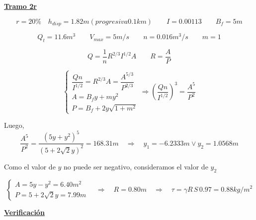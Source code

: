 \underline{\bf Tramo 2r}


\begin{equation*}
  r = 20\%
  \quad
  h_{disp} = 1.82 m (progresiva 0.1 km)
 \qquad
  I = 0.00113
 \qquad
  B_{f} = 5 m
\end{equation*}

\begin{equation*}
  Q_{t} = 11.6 m^{3}
 \qquad
  V_{max} = 5 m/s
 \qquad
  n = 0.016 m^3/s
 \qquad
  m = 1
\end{equation*}

\begin{equation*}
 Q = \frac{1}{n} R^{2/3} I^{1/2} A
 \qquad
 R = \frac{A}{P}
\end{equation*}

\begin{equation*}
  \begin{cases}
    \dfrac{Q n}{I^{1/2}} = R^{2/3} A = \dfrac{A^{5/3}}{P^{2/3}} \\
    A = B_{f}y + m y^{2} \\
    P = B_{f} + 2 y \sqrt{1 + m^{2}}
  \end{cases}
  \Longrightarrow
  (\dfrac{Q n}{I^{1/2}})^{3} = \dfrac{A^{5}}{P^{2}}
\end{equation*}

Luego,
\begin{equation*}
  \dfrac{A^{5}}{P^{2}} = \dfrac{(5 y + y^{2})^{5}}{(5 + 2 \sqrt{2} y)^{2}} = 168.31 m
  \quad
  \Longrightarrow
  \quad
  y_{1} = -6.2333 m \vee y_{2} = 1.0568 m
\end{equation*}


Como el valor de $y$ no puede ser negativo, consideramos el valor de $y_{2}$

\begin{equation*}
  \begin{cases}
    A = 5 y - y^{2} = 6.40 m^{2} \\
    P = 5 + 2 \sqrt{2} y = 7.99 m
  \end{cases}
  \quad
  \Longrightarrow
  \quad
  R = 0.80 m
  \quad
  \Longrightarrow
  \quad
  \tau = \gamma R \, S \, 0.97 = 0.88 kg/m^{2}
\end{equation*}


\underline{\bf Verificación}

